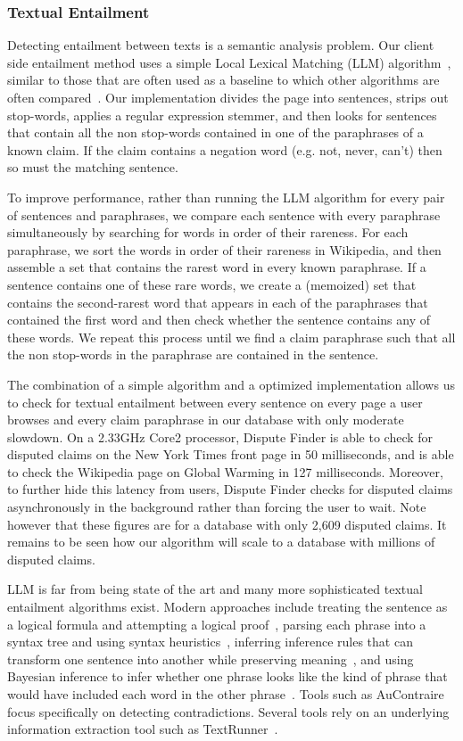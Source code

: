 \documentclass{www2010-accepted}
\begin{document}
\subsubsection{Textual Entailment}

Detecting entailment between texts is a semantic analysis problem. Our client side entailment method uses a simple Local Lexical Matching (LLM) algorithm~\cite{Jijkoun2006}, similar to those that are often used as a baseline to which other algorithms are often compared~\cite{Braz}. Our implementation divides the page into sentences, strips out stop-words, applies a regular expression stemmer, and then looks for sentences that contain all the non stop-words contained in one of the paraphrases of a known claim. If the claim contains a negation word (e.g. not, never, can't) then so must the matching sentence. 

To improve performance, rather than running the LLM algorithm for every pair of sentences and paraphrases, we compare each sentence with every paraphrase simultaneously by searching for words in order of their rareness. For each paraphrase, we sort the words in order of their rareness in Wikipedia, and then assemble a set that contains the rarest word in every known paraphrase. If a sentence contains one of these rare words, we create a (memoized) set that contains the second-rarest word that appears in each of the paraphrases that contained the first word and then check whether the sentence contains any of these words. We repeat this process until we find a claim paraphrase such that all the non stop-words in the paraphrase are contained in the sentence.

The combination of a simple algorithm and a optimized implementation allows us to check for textual entailment between every sentence on every page a user browses and every claim paraphrase in our database with only moderate slowdown. On a 2.33GHz Core2 processor, Dispute Finder is able to check for disputed claims on the New York Times front page in 50 milliseconds, and is able to check the Wikipedia page on Global Warming in 127 milliseconds. Moreover, to further hide this latency from users, Dispute Finder checks for disputed claims asynchronously in the background rather than forcing the user to wait. Note however that these figures are for a database with only 2,609 disputed claims. It remains to be seen how our algorithm will scale to a database with millions of disputed claims.

LLM is far from being state of the art and many more sophisticated textual entailment algorithms exist. Modern approaches include treating the sentence as a logical formula and attempting a logical proof~\cite{Bayer2001,Bos2005}, parsing each phrase into a syntax tree and using syntax heuristics~\cite{Snow2006}, inferring inference rules that can transform one sentence into another while preserving meaning~\cite{Lin2001,Dinu2009,Bhagat2009}, and using Bayesian inference to infer whether one phrase looks like the kind of phrase that would have included each word in the other phrase~\cite{Glickman2005}. Tools such as AuContraire~\cite{Ritter} focus specifically on detecting contradictions. Several tools rely on an underlying information extraction tool such as TextRunner~\cite{Etzioni2008}.
\end{document}
